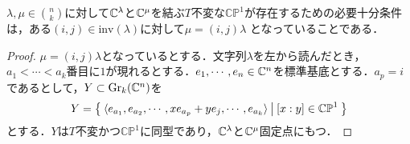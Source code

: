 \begin{prop}
  $\lambda,\mu\in\binom{n}{k}$に対して$\mathbb{C}^\lambda$と$\mathbb{C}^\mu$を結ぶ$T$不変な$\mathbb{CP}^1$が存在するための必要十分条件は，ある$(i, j)\in\text{inv}(\lambda)$に対して$\mu = (i, j)\lambda$
  となっていることである．
\end{prop}

\begin{proof}
  $\mu = (i,j)\lambda$となっているとする．文字列$\lambda$を左から読んだとき，$a_1<\cdots<a_k$番目に$1$が現れるとする．$e_1,\cdots,e_n\in\mathbb{C}^n$を標準基底とする．$a_p = i$であるとして，$Y\subset \text{Gr}_k(\mathbb{C}^n)$を
  \begin{equation}\label{1dim orbit}
  Y=\left\{\:\langle e_{a_1},e_{a_2},\cdots, xe_{a_p}+ye_j,\cdots,e_{a_k} \rangle\:\middle|\:[x:y]\in\mathbb{CP}^1\:\right\}
  \end{equation}
  とする．$Y$は$T$不変かつ$\mathbb{CP}^1$に同型であり，$\mathbb{C}^\lambda$と$\mathbb{C}^\mu$固定点にもつ．


\end{proof}
